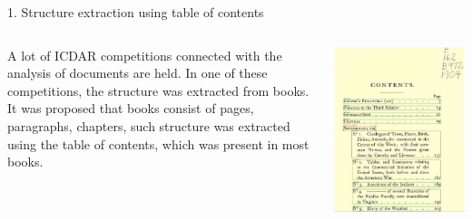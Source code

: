 \documentclass{beamer}
\begin{document}
\begin{frame}{1. Structure extraction using table of contents}
    \begin{columns}
        \begin{column}{0.5\textwidth}
        A lot of ICDAR competitions connected with the analysis of documents are held. In one of these competitions, the structure was extracted from books. It was proposed that books consist of pages, paragraphs, chapters, such structure was extracted using the table of contents, which was present in most books.
        \end{column}
        \begin{column}{0.5\textwidth}
        \includegraphics[width=\textwidth]{pics/toc.png}
        \end{column}
    \end{columns}
\end{frame}
\end{document}
